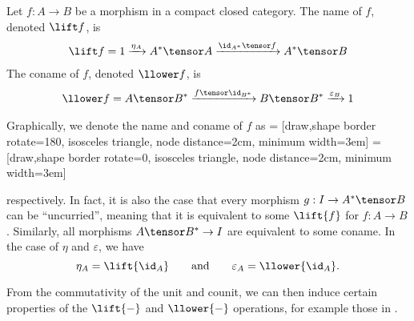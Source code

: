 \begin{definition}
    Let $f : A \rightarrow B$ be a morphism in a compact closed category. The name of $f$,
    denoted $\lift f$, is
    \begin{align*}
        \lift f = 1 
         \xrightarrow{\eta_A} A^* \tensor A
         \xrightarrow{\id_{A^*} \tensor f} A^* \tensor B
    \end{align*}
    The coname of $f$, denoted $\llower f$, is
    \begin{align*}
        \llower f = A \tensor B^*
        \xrightarrow{f \tensor \id_{B^*}} B \tensor B^*
        \xrightarrow{\varepsilon_B} 1
    \end{align*}
\end{definition}
Graphically, we denote the name and coname of $f$ as
 = [draw,shape border rotate=180, 
                        isosceles triangle,
                        node distance=2cm, minimum width=3em]
 = [draw,shape border rotate=0,
                        isosceles triangle,
                        node distance=2cm, minimum width=3em]

\begin{center}  \end{center}
respectively.
In fact, it is also the case that every morphism $g : I \rightarrow A^* \tensor B$ can
be ``uncurried'', meaning that it is equivalent to some $\lift{f}$ for $f:A \rightarrow B$.
Similarly, all morphisms $A \tensor B^* \rightarrow I$ are equivalent to some coname.
In the case of $\eta$ and $\varepsilon$, we have
\[ \eta_A = \lift{\id_A} \qquad\text{and}\qquad \varepsilon_A = \llower{\id_A}. \]

From the commutativity of the unit and counit, we can then induce certain properties of the
$\lift{-}$ and $\llower{-}$ operations, for example those in .

